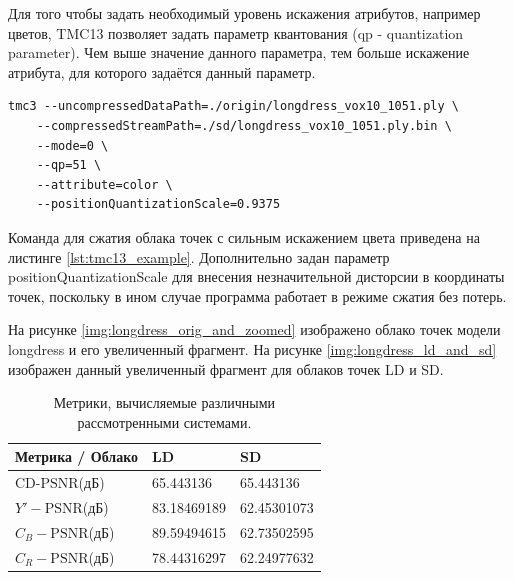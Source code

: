 Для того чтобы задать необходимый уровень искажения атрибутов, например цветов,
TMC13 позволяет задать параметр квантования (qp - quantization parameter). Чем
выше значение данного параметра, тем больше искажение атрибута, для которого
задаётся данный параметр.

\begin{lstlisting}[caption={
    Пример сжатия облака точек посредством кодека TMC13, используются параметры,
    обеспечивающие сильное искажение цвета.
}, label={lst:tmc13_example}]
tmc3 --uncompressedDataPath=./origin/longdress_vox10_1051.ply \
	--compressedStreamPath=./sd/longdress_vox10_1051.ply.bin \
	--mode=0 \
	--qp=51 \
	--attribute=color \
	--positionQuantizationScale=0.9375
\end{lstlisting}

Команда для сжатия облака точек с сильным искажением цвета приведена на листинге
\ref{lst:tmc13_example}. Дополнительно задан параметр positionQuantizationScale
для внесения незначительной дисторсии в координаты точек, поскольку в ином
случае программа работает в режиме сжатия без потерь.



На рисунке \ref{img:longdress_orig_and_zoomed} изображено облако точек модели
longdress и его увеличенный фрагмент. На рисунке \ref{img:longdress_ld_and_sd}
изображен данный увеличенный фрагмент для облаков точек LD и SD.

\begin{xltabular}{\linewidth}{|l|X|X|}
    \caption{
        Метрики, вычисляемые различными рассмотренными системами.
        \label{tab:longdress_distortions}
    } \\
    \hline
    Метрика / Облако & LD & SD \\
    \hline
    $\text{CD-PSNR}$(дБ) & 65.443136 & 65.443136 \\
    \hline
    $Y'-\text{PSNR}$(дБ) & 83.18469189 & 62.45301073 \\
    \hline
    $C_{B}-\text{PSNR}$(дБ) & 89.59494615 & 62.73502595 \\
    \hline
    $C_{R}-\text{PSNR}$(дБ) & 78.44316297 & 62.24977632 \\
    \hline
\end{xltabular}


